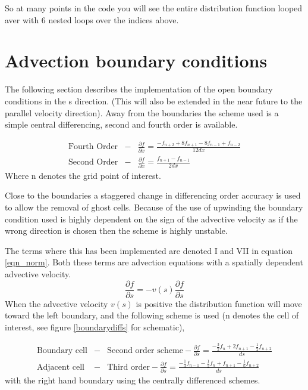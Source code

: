 \documentclass{report}
\begin{document}
So at many points in the code you will see the entire distribution function looped aver with 6 nested loops over the indices above.


\section{Advection boundary conditions}%
The following section describes the implementation of the open boundary conditions in the s direction. (This will also be extended in the near future to the parallel velocity direction).  Away from the boundaries the scheme used is a simple central differencing, second and fourth order is available.

\begin{eqnarray}
\mbox{Fourth Order} &-& \frac{\partial f}{\partial x} = \frac{-f_{n+2} + 8f_{n+1} - 8f_{n-1} + f_{n-2}}{12dx} \nonumber\\
\mbox{Second Order} &-& \frac{\partial f}{\partial x} = \frac{f_{n+1} - f_{n-1}}{2dx} \nonumber
\end{eqnarray}
\noindent
Where n denotes the grid point of interest.

Close to the boundaries a staggered change in differencing order accuracy is used to allow the removal of ghost cells.  Because of the use of upwinding the boundary condition used is highly dependent on the sign of the advective velocity as if the wrong direction is chosen then the scheme is highly unstable.

The terms where this has been implemented are denoted I and VII in equation \ref{eqn_norm}.  Both these terms are advection equations with a spatially dependent advective velocity.
\begin{equation}
\frac{\partial f}{\partial s} = -v(s)\frac{\partial f}{\partial s}
\end{equation}
When the advective velocity $v(s)$ is positive the distribution function will move toward the left boundary, and the following scheme is used (n denotes the cell of interest, see figure \ref{boundarydiffs} for schematic),

\begin{eqnarray}
\mbox{Boundary cell} &-& \mbox{Second order scheme} - \frac{\partial f}{\partial s} = \frac{-\frac{3}{2}f_{n} + 2f_{n+1} -\frac{1}{2}f_{n+2}}{ds}\nonumber\\
\mbox{Adjacent cell} &-& \mbox{Third order} - \frac{\partial f}{\partial s} = \frac{-\frac{1}{3}f_{n-1} -\frac{1}{2}f_{n} + f_{n+1} - \frac{1}{6}f_{n+2}}{ds}\nonumber
\end{eqnarray}
with the right hand boundary using the centrally differenced schemes.  
\end{document}
